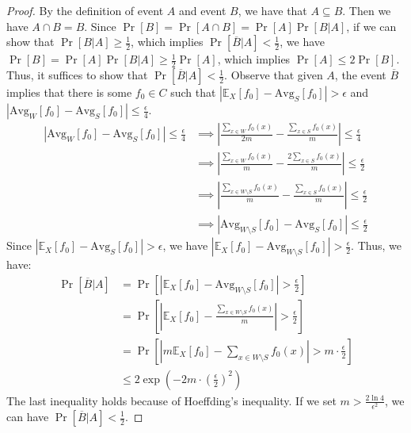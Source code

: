 \begin{proof}
    By the definition of event $A$ and event $B$, we have that $A\subseteq B$.
    Then we have $A\cap B =B$.
    Since $\Pr[B]=\Pr[A\cap B]=\Pr [A]\Pr[B|A]$,
    if we can show that $\Pr[B|A]\ge \frac{1}{2}$, which implies $\Pr[\overline{B}|A]< \frac{1}{2}$, we have 
    $\Pr[B]=\Pr [A]\Pr[B|A]\ge \frac{1}{2}\Pr [A]$, which implies $\Pr[A]\le 2\Pr[B]$.
    Thus, it suffices to show that $\Pr[\overline{B}|A]< \frac{1}{2}$.
    Observe that given $A$, the event $\overline{B}$ implies that there is some $f_0\in C$ such that 
    $|\mathbb{E}_X[f_0]-\text{Avg}_S[f_0]|>\epsilon$ and $|\text{Avg}_W[f_0]-\text{Avg}_S[f_0]|\le\frac{\epsilon}{4}$.
    \begin{align}
        \nonumber \left| \text{Avg}_W[f_0]-\text{Avg}_S[f_0]\right|\le\frac{\epsilon}{4} &\implies \left|\frac{\sum_{x\in W}f_0(x)}{2m}-\frac{\sum_{x\in S}f_0(x)}{m}\right|\le\frac{\epsilon}{4}\\
        \nonumber &\implies \left|\frac{\sum_{x\in W}f_0(x)}{m}-\frac{2\sum_{x\in S}f_0(x)}{m}\right|\le\frac{\epsilon}{2}\\
        \nonumber &\implies \left|\frac{\sum_{x\in W\setminus S}f_0(x)}{m}-\frac{\sum_{x\in S}f_0(x)}{m}\right|\le\frac{\epsilon}{2}\\
        \nonumber &\implies \left|\text{Avg}_{W\setminus S}[f_0]-\text{Avg}_S[f_0]\right|\le\frac{\epsilon}{2}
    \end{align}
    Since $|\mathbb{E}_X[f_0]-\text{Avg}_S[f_0]|>\epsilon$, we have $|\mathbb{E}_X[f_0]-\text{Avg}_{W\setminus S}[f_0]|>\frac{\epsilon}{2}$.
    Thus, we have: 
    \begin{align}
        \nonumber \Pr\left[\overline{B}|A\right]&=\Pr\left[|\mathbb{E}_X[f_0]-\text{Avg}_{W\setminus S}[f_0]|>\frac{\epsilon}{2}\right]\\
        \nonumber &=\Pr\left[\left|\mathbb{E}_X[f_0]-\frac{\sum_{x\in W \setminus S}f_0(x)}{m}\right|>\frac{\epsilon}{2}\right]\\
        \nonumber &=\Pr\left[\left|m\mathbb{E}_X[f_0]-\sum_{x\in W \setminus S}f_0(x)\right|>m\cdot \frac{\epsilon}{2}\right]\\
        \nonumber &\le 2\exp\left(-2m\cdot \left(\frac{\epsilon}{2}\right)^2\right)
    \end{align}
    The last inequality holds because of Hoeffding's inequality.
    If we set $m>\frac{2\ln4}{\epsilon^2}$, we can have $\Pr\left[\overline{B}|A\right]<\frac{1}{2}$.
\end{proof}
